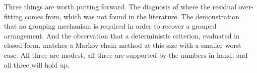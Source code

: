 Three things are worth putting forward. The diagnosis of where the residual
over-fitting comes from, which was not found in the literature. The demonstration
that no grouping mechanism is required in order to recover a grouped arrangement.
And the observation that a deterministic criterion, evaluated in closed form,
matches a Markov chain method at this size with a smaller worst case. All three are
modest, all three are supported by the numbers in hand, and all three will hold up.





